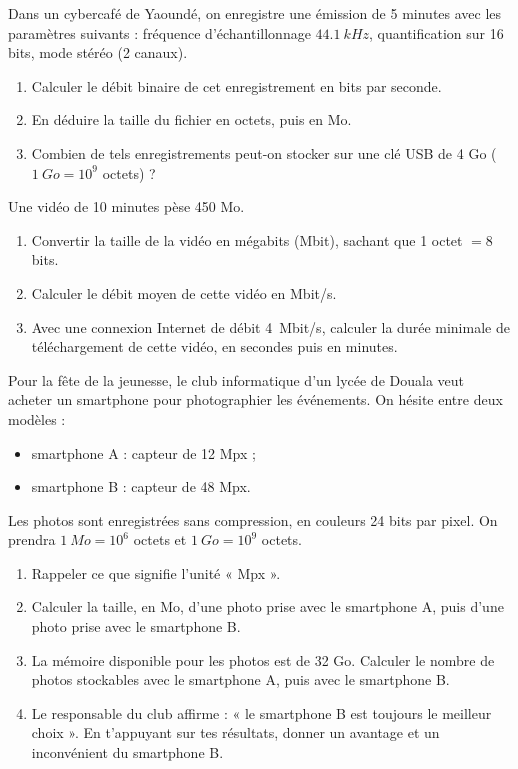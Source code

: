 \documentclass[11pt]{article}
\newcounter{popsec}
\newcounter{popsub}
\newcommand{\courssub}[1]{%
  \stepcounter{popsub}%
  \par\vspace{9pt}\noindent{\popxbold\fontsize{11.5}{13}\selectfont\color{popink}{\color{poporange}\thepopsec.\thepopsub}\hspace{6pt}#1}\par\nopagebreak\vspace{4pt}
}
\begin{document}
\begin{exercice}
Dans un cybercafé de Yaoundé, on enregistre une émission de 5 minutes avec les paramètres suivants : fréquence d'échantillonnage $\SI{44,1}{kHz}$, quantification sur 16 bits, mode stéréo (2 canaux).
\begin{enumerate}
\item Calculer le débit binaire de cet enregistrement en bits par seconde.
\item En déduire la taille du fichier en octets, puis en Mo.
\item Combien de tels enregistrements peut-on stocker sur une clé USB de 4 Go ($\SI{1}{Go} = 10^9$ octets) ?
\end{enumerate}
\end{exercice}

\begin{exercice}
Une vidéo de 10 minutes pèse 450 Mo.
\begin{enumerate}
\item Convertir la taille de la vidéo en mégabits (Mbit), sachant que 1 octet $= 8$ bits.
\item Calculer le débit moyen de cette vidéo en Mbit/s.
\item Avec une connexion Internet de débit \SI{4}{Mbit/s}, calculer la durée minimale de téléchargement de cette vidéo, en secondes puis en minutes.
\end{enumerate}
\end{exercice}

\courssub{Je me prépare au Probatoire}

\begin{exercice}
Pour la fête de la jeunesse, le club informatique d'un lycée de Douala veut acheter un smartphone pour photographier les événements. On hésite entre deux modèles :
\begin{itemize}
\item smartphone A : capteur de 12 Mpx ;
\item smartphone B : capteur de 48 Mpx.
\end{itemize}
Les photos sont enregistrées sans compression, en couleurs 24 bits par pixel. On prendra $\SI{1}{Mo} = 10^6$ octets et $\SI{1}{Go} = 10^9$ octets.
\begin{enumerate}
\item Rappeler ce que signifie l'unité « Mpx ».
\item Calculer la taille, en Mo, d'une photo prise avec le smartphone A, puis d'une photo prise avec le smartphone B.
\item La mémoire disponible pour les photos est de 32 Go. Calculer le nombre de photos stockables avec le smartphone A, puis avec le smartphone B.
\item Le responsable du club affirme : « le smartphone B est toujours le meilleur choix ». En t'appuyant sur tes résultats, donner un avantage et un inconvénient du smartphone B.
\end{enumerate}
\end{exercice}
\end{document}
